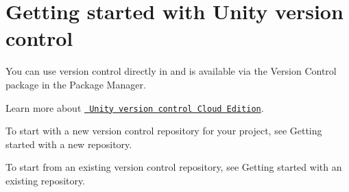 \chapter{Getting started with Unity version control}
\hypertarget{md__hey_tea_9_2_library_2_package_cache_2com_8unity_8collab-proxy_0d2_80_85_2_documentation_0i_2_get_01started}{}\label{md__hey_tea_9_2_library_2_package_cache_2com_8unity_8collab-proxy_0d2_80_85_2_documentation_0i_2_get_01started}
\label{md__hey_tea_9_2_library_2_package_cache_2com_8unity_8collab-proxy_0d2_80_85_2_documentation_0i_2_get_01started_autotoc_md868}%
%
 You can use  version control directly in  and is available via the Version Control package in the  Package Manager.

Learn more about \href{https://unity.com/products/plastic-scm}{\texttt{ Unity version control Cloud Edition}}.


\begin{DoxyItemize}
\item To start with a new version control repository for your project, see Getting started with a new repository.
\item To start from an existing  version control repository, see Getting started with an existing repository. 
\end{DoxyItemize}